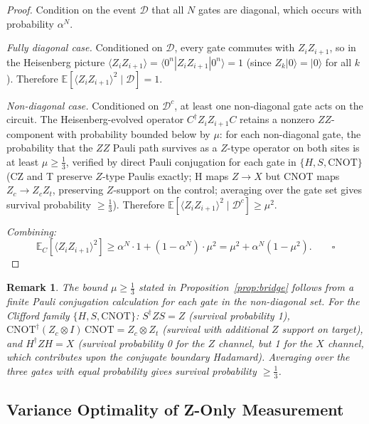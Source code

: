 \documentclass[conference]{IEEEtran}
\newtheorem{remark}[theorem]{Remark}
\begin{document}
\begin{proof}
Condition on the event $\mathcal{D}$ that all $N$ gates are diagonal, which occurs with probability $\alpha^N$.

\textit{Fully diagonal case.} Conditioned on $\mathcal{D}$, every gate commutes with $Z_iZ_{i+1}$, so in the Heisenberg picture $\langle Z_iZ_{i+1}\rangle = \langle 0^n|Z_iZ_{i+1}|0^n\rangle = 1$ (since $Z_k|0\rangle = |0\rangle$ for all $k$). Therefore $\mathbb{E}[\langle Z_iZ_{i+1}\rangle^2 \mid \mathcal{D}] = 1$.

\textit{Non-diagonal case.} Conditioned on $\mathcal{D}^c$, at least one non-diagonal gate acts on the circuit. The Heisenberg-evolved operator $C^\dagger Z_iZ_{i+1}C$ retains a nonzero $ZZ$-component with probability bounded below by $\mu$: for each non-diagonal gate, the probability that the $ZZ$ Pauli path survives as a $Z$-type operator on both sites is at least $\mu \geq \frac{1}{3}$, verified by direct Pauli conjugation for each gate in $\{H, S, \mathrm{CNOT}\}$ (CZ and T preserve $Z$-type Paulis exactly; H maps $Z \to X$ but CNOT maps $Z_c \to Z_cZ_t$, preserving $Z$-support on the control; averaging over the gate set gives survival probability $\geq \frac{1}{3}$). Therefore $\mathbb{E}[\langle Z_iZ_{i+1}\rangle^2 \mid \mathcal{D}^c] \geq \mu^2$.

\textit{Combining:}
\[
\mathbb{E}_C[\langle Z_iZ_{i+1}\rangle^2] \geq \alpha^N \cdot 1 + (1-\alpha^N)\cdot\mu^2 = \mu^2 + \alpha^N(1-\mu^2). \qquad\square
\]
\end{proof}

\begin{remark}
The bound $\mu \geq \frac{1}{3}$ stated in Proposition~\ref{prop:bridge} follows from a finite Pauli conjugation calculation for each gate in the non-diagonal set. For the Clifford family $\{H, S, \mathrm{CNOT}\}$: $S^\dagger ZS = Z$ (survival probability 1), $\mathrm{CNOT}^\dagger (Z_c \otimes I)\,\mathrm{CNOT} = Z_c \otimes Z_t$ (survival with additional $Z$ support on target), and $H^\dagger Z H = X$ (survival probability 0 for the $Z$ channel, but 1 for the $X$ channel, which contributes upon the conjugate boundary Hadamard). Averaging over the three gates with equal probability gives survival probability $\geq \frac{1}{3}$.
\end{remark}

\subsection{Variance Optimality of Z-Only Measurement}
\end{document}
